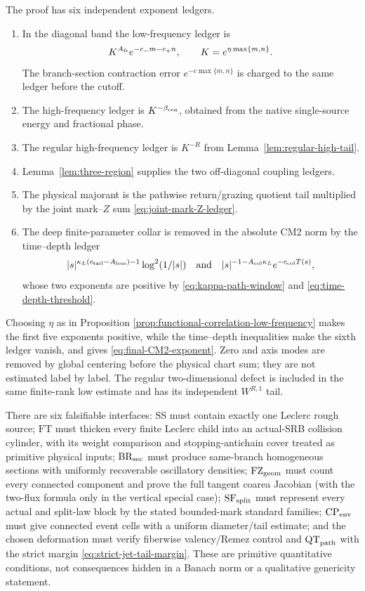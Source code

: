 \documentclass[11pt]{article}
\begin{document}
The proof has six independent exponent ledgers.
\begin{enumerate}[label=\textup{(A\arabic*)}]
\item In the diagonal band the low-frequency ledger is
\[
K^{A_{\rm fr}}e^{-c_-m-c_+n},
 \qquad K=e^{\eta\max\{m,n\}}.
\]
The branch-section contraction error
$e^{-c\max\{m,n\}}$ is charged to the same ledger before the cutoff.
\item The high-frequency ledger is
$K^{-\beta_{\rm cen}}$, obtained from the native single-source energy and
fractional phase.
\item The regular high-frequency ledger is $K^{-R}$ from
Lemma~\ref{lem:regular-high-tail}.
\item Lemma~\ref{lem:three-region} supplies the two off-diagonal coupling
ledgers.
\item The physical majorant is the pathwise return/grazing quotient tail
multiplied by the joint mark--$Z$ sum \eqref{eq:joint-mark-Z-ledger}.
\item The deep finite-parameter collar is removed in the absolute CM2 norm by
the time--depth ledger
\[
 |s|^{\kappa_L(c_{\rm tail}-A_{\rm loss})-1}\log^2(1/|s|)
 \quad\hbox{and}\quad
 |s|^{-1-A_{\rm col}\kappa_L}e^{-c_{\rm col}T(s)},
\]
whose two exponents are positive by
\eqref{eq:kappa-path-window} and \eqref{eq:time-depth-threshold}.
\end{enumerate}
Choosing $\eta$ as in Proposition
\ref{prop:functional-correlation-low-frequency} makes the first five
exponents positive, while the time--depth inequalities make the sixth ledger
vanish, and gives \eqref{eq:final-CM2-exponent}.  Zero and axis modes are
removed by global centering before the physical chart sum; they are not
estimated label by label.  The regular two-dimensional defect is included in
the same finite-rank low estimate and has its independent $W^{R,1}$ tail.

There are six falsifiable interfaces: $\mathrm{SS}$ must contain
exactly one Leclerc rough source; $\mathrm{FT}$ must thicken every finite
Leclerc child into an actual-SRB collision cylinder, with its weight
comparison and stopping-antichain cover treated as primitive physical inputs;
$\mathrm{BR}_{\rm sec}$ must produce same-branch homogeneous sections with
uniformly recoverable oscillatory densities; $\mathrm{FZ}_{\rm geom}$ must
count every connected component and prove the full tangent coarea Jacobian
(with the two-flux formula only in the vertical special case);
$\mathrm{SF}_{\rm split}$ must represent every actual and split-law block by
the stated bounded-mark standard families; $\mathrm{CP}_{\rm env}$ must give
connected event cells with a uniform diameter/tail estimate; and the chosen
deformation must verify fiberwise valency/Remez control and
$\mathrm{QT}_{\rm path}$ with the strict margin
\eqref{eq:strict-jet-tail-margin}.  These are primitive
quantitative conditions, not consequences hidden in a Banach norm or a
qualitative genericity statement.
\end{document}
